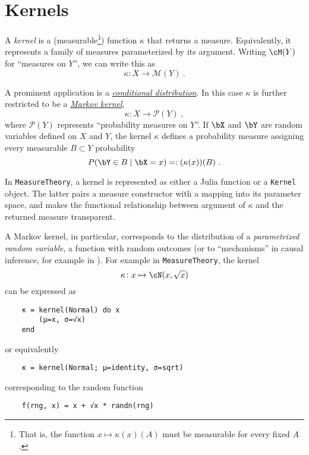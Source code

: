 \documentclass{juliacon}
\begin{document}
\section{Kernels}

A \emph{kernel} is a (measurable\footnote{That is, the function $x \mapsto \kappa(x)(A)$ must be measurable for every fixed $A$.}) function $\kappa$ that returns a measure. Equivalently, it represents a family of measures parameterized by its argument. Writing $\cM(Y)$ for ``measures on $Y$'', we can write this as
\[
\kappa\colon X \to \mathscr{M}(Y)\ .
\]

A prominent application is a \href{https://en.wikipedia.org/wiki/Conditional_probability_distribution}{\emph{conditional distribution}}. In this case $\kappa$ is further restricted to be a \href{https://en.wikipedia.org/wiki/Markov_kernel}{\emph{Markov kernel}}, 
\[
\kappa\colon X \to \mathscr{P}(Y)\ ,
\]
where $\mathscr{P}(Y)$ represents ``probability measures on $Y$''.
If $\bX$ and $\bY$ are random variables defined on $X$ and $Y$, the kernel $\kappa$ defines a probability measure assigning every measurable $B\subset Y$ probability
\[
P(\bY \in B \mid \bX = x) =: (\kappa(x))(B)\ .
\]

In \verb|MeasureTheory|, a kernel is represented as either a Julia function or a \verb|Kernel| object. The latter pairs a measure constructor with a mapping into its parameter space, and makes the functional relationship between argument of $\kappa$ and the returned measure transparent.

A Markov kernel, in particular, corresponds to the distribution of a \emph{parametrized random variable}, a function with random outcomes (or to ``mechanisms'' in causal inference, for example in \cite{https://doi.org/10.5281/zenodo.1005091}). For example in \verb|MeasureTheory|, the kernel
\[
\kappa\colon x \mapsto \cN(x,\sqrt{x})
\]
can be expressed as
\begin{verbatim}
    κ = kernel(Normal) do x
        (μ=x, σ=√x)
    end
\end{verbatim}
or equivalently
\begin{verbatim}
    κ = kernel(Normal; μ=identity, σ=sqrt)
\end{verbatim}
corresponding to the random function
\begin{verbatim}
    f(rng, x) = x + √x * randn(rng)
\end{verbatim}
\end{document}
